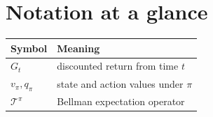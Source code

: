 \chapter*{Notation at a glance}

\begin{tabularx}{\textwidth}{@{}lX@{}}
\toprule
\textbf{Symbol} & \textbf{Meaning} \\
\midrule
$G_t$ & discounted return from time $t$ \\
$v_\pi,q_\pi$ & state and action values under $\pi$ \\
$\mathcal{T}^{\pi}$ & Bellman expectation operator \\
\bottomrule
\end{tabularx}
